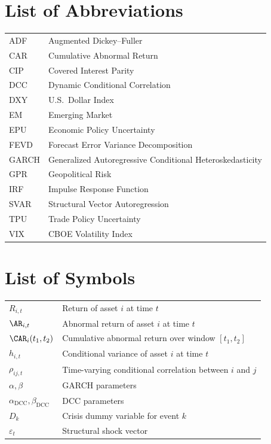 

\chapter*{List of Abbreviations}\label{av}
\begin{tabular}{ll}
ADF   & Augmented Dickey--Fuller \\
CAR   & Cumulative Abnormal Return \\
CIP   & Covered Interest Parity \\
DCC   & Dynamic Conditional Correlation \\
DXY   & U.S.\ Dollar Index \\
EM    & Emerging Market \\
EPU   & Economic Policy Uncertainty \\
FEVD  & Forecast Error Variance Decomposition \\
GARCH & Generalized Autoregressive Conditional Heteroskedasticity \\
GPR   & Geopolitical Risk \\
IRF   & Impulse Response Function \\
SVAR  & Structural Vector Autoregression \\
TPU   & Trade Policy Uncertainty \\
VIX   & CBOE Volatility Index \\
\end{tabular}

\listoffigures

\listoftables

\chapter*{List of Symbols}\label{sv}
\begin{tabular}{ll}
$R_{i,t}$          & Return of asset $i$ at time $t$ \\
$\AR_{i,t}$        & Abnormal return of asset $i$ at time $t$ \\
$\CAR_{i}(t_1,t_2)$ & Cumulative abnormal return over window $[t_1, t_2]$ \\
$h_{i,t}$          & Conditional variance of asset $i$ at time $t$ \\
$\rho_{ij,t}$      & Time-varying conditional correlation between $i$ and $j$ \\
$\alpha, \beta$     & GARCH parameters \\
$\alpha_{\text{DCC}}, \beta_{\text{DCC}}$ & DCC parameters \\
$D_k$              & Crisis dummy variable for event $k$ \\
$\varepsilon_t$    & Structural shock vector \\
\end{tabular}
